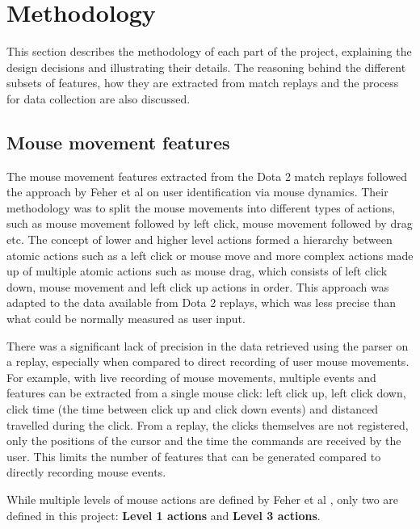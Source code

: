 \documentclass[Report.tex]{subfiles}
\begin{document}
\section{Methodology}\label{sec:methodology}
This section describes the methodology of each part of the project, explaining the design decisions and illustrating their details. The reasoning behind the different subsets of features, how they are extracted from match replays and the process for data collection are also discussed.

\subsection{Mouse movement features}\label{sec:mm-features}
The mouse movement features extracted from the Dota 2 match replays followed the approach by Feher et al \cite{mouse-dynamics} on user identification via mouse dynamics. Their methodology was to split the mouse movements into different types of actions, such as mouse movement followed by left click, mouse movement followed by drag etc. The concept of lower and higher level actions formed a hierarchy between atomic actions such as a left click or mouse move and more complex actions made up of multiple atomic actions such as mouse drag, which consists of left click down, mouse movement and left click up actions in order. This approach was adapted to the data available from Dota 2 replays, which was less precise than what could be normally measured as user input. 

There was a significant lack of precision in the data retrieved using the parser on a replay, especially when compared to direct recording of user mouse movements. For example, with live recording of mouse movements, multiple events and features can be extracted from a single mouse click: left click up, left click down, click time (the time between click up and click down events) and distanced travelled during the click. From a replay, the clicks themselves are not registered, only the positions of the cursor and the time the commands are received by the user. This limits the number of features that can be generated compared to directly recording mouse events.

While multiple levels of mouse actions are defined by Feher et al \cite{mouse-dynamics}, only two are defined in this project: \textbf{Level 1 actions} and \textbf{Level 3 actions}.
\end{document}
